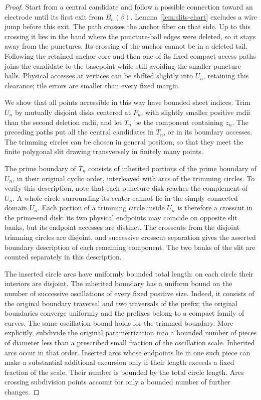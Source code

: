 \begin{proof}
Start from a central candidate and follow a possible connection
toward an electrode until its first exit from $B_n(\beta)$.
Lemma~\ref{lem:slits-chart} excludes a wire jump before this exit.
The path crosses the anchor fiber on that side.  Up to this crossing
it lies in the band where the puncture-ball edges were deleted, so
it stays away from the punctures.  Its crossing of the anchor cannot
be in a deleted tail.  Following the retained anchor core and then
one of its fixed compact access paths joins the candidate to the
basepoint while still avoiding the smaller puncture balls.  Physical
accesses at vertices can be shifted slightly into $U_n$, retaining
this clearance; tile errors are smaller than every fixed margin.

We show that all points accessible in this way have bounded sheet
indices.  Trim $U_n$ by mutually disjoint disks centered at $P_n$,
with slightly smaller positive radii than the second deletion radii,
and let $T_n$ be the component containing $z_n$.  The preceding paths
put all the central candidates in $T_n$, or in its boundary accesses.
The trimming circles can be chosen in general position, so that
they meet the finite polygonal slit drawing transversely in finitely
many points.

The prime boundary of $T_n$ consists of inherited portions of the
prime boundary of $U_n$, in their original cyclic order, interleaved
with arcs of the trimming circles.  To verify this description, note
that each puncture disk reaches the complement of $U_n$.  A whole
circle surrounding its center cannot lie in the simply connected
domain $U_n$.  Each portion of a trimming circle inside $U_n$ is
therefore a crosscut in the prime-end disk: its two physical
endpoints may coincide on opposite slit banks, but its endpoint
accesses are distinct.  The crosscuts from the disjoint trimming
circles are disjoint, and successive crosscut separation gives the
asserted boundary description of each remaining component.  The
two banks of the slit are counted separately in this description.

The inserted circle arcs have uniformly bounded total length: on
each circle their interiors are disjoint.  The inherited boundary
has a uniform bound on the number of successive oscillations of
every fixed positive size.  Indeed, it consists of the original
boundary traversal and two traversals of the prefix; the original
boundaries converge uniformly and the prefixes belong to a compact
family of curves.  The same oscillation bound holds for the trimmed
boundary.  More explicitly, subdivide the original parametrization
into a bounded number of pieces of diameter less than a prescribed
small fraction of the oscillation scale.  Inherited arcs occur in
that order.  Inserted arcs whose endpoints lie in one such piece
can make a substantial additional excursion only if their length
exceeds a fixed fraction of the scale.  Their number is bounded by
the total circle length.  Arcs crossing subdivision points account
for only a bounded number of further changes.


\end{proof}
